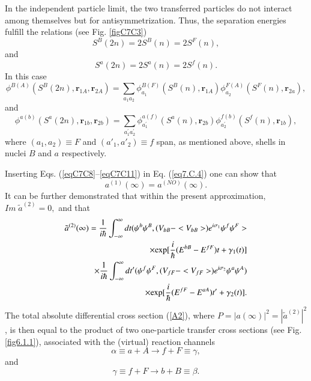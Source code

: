 In the independent particle limit, the two transferred particles do not interact among themselves but for antisymmetrization. 
Thus, the separation energies fulfill the relations (see Fig. \ref{figC7C3})
\begin{equation}\label{eqC7C8}
S^B(2n) = 2 S^B(n) = 2S^F(n),
\end{equation}
and 
\begin{equation}\label{eqC7C9}
S^a(2n) = 2 S^a(n) = 2 S^f(n).
\end{equation}
In this case 
\begin{equation}\label{eqC7C10}
\phi^{B(A)} (S^B(2n), \mathbf r_{1A},\mathbf r_{2A}) = \sum_{a_1 a_2} \phi_{a_1}^{B(F)} (S^B(n),\mathbf r_{1A}) 
\phi_{a_{2}}^{F(A)} (S^F(n),\mathbf r_{2a}),
\end{equation}
and 
\begin{equation}\label{eqC7C11}
\phi^{a(b)} (S^a(2n), \mathbf r_{1b},\mathbf r_{2b}) = 
\sum_{a^{'}_{1} a^{'}_{2}} \phi_{a^{'}_1}^{a(f)} (S^a(n),\mathbf r_{2b}) 
\phi_{a^{'}_{2}}^{f(b)} (S^f(n),\mathbf r_{1b}),
\end{equation}
where $(a_1, a_2) \equiv F$ and $(a'_1, a'_2) \equiv f$ span, as mentioned above, shells in nuclei $B$ and $a$ respectively. 

Inserting Eqs. (\ref{eqC7C8}--\ref{eqC7C11}) in Eq. (\ref{eq7.C.4}) one can show that 
\begin{equation}\label{eqC7C12}
a^{(1)} (\infty) = a^{(NO)}(\infty).
\end{equation}
It can be further demonstrated  that within the present approximation, $Im \; \tilde a^{(2)} =0,$ and that 
\begin{eqnarray}\label{eqC7C13}
\nonumber \tilde a^{(2)} (\infty) = \frac{1}{i \hbar} \int^{\infty}_{-\infty} dt (\psi^b \psi^B, (V_{bB} - <V_{bB}>) e^{i \sigma_1} \psi^f \psi^F >\\
\nonumber  \times 
{\rm exp} [\frac{i}{\hbar} (E^{bB} - E^{fF}) t + \gamma_1(t)] \nonumber  \\
\nonumber \times \frac{1}{i \hbar} \int^{\infty}_{-\infty} dt' (\psi^f \psi^F, (V_{fF} - <V_{fF}>) e^{i \sigma_2} \psi^a \psi^A ) \\
\times 
{\rm exp} [\frac{i}{\hbar} (E^{fF} - E^{aA}) t' + \gamma_2(t)].
\label{A12}
\end{eqnarray}
The total absolute differential cross section (\ref{A2}), where $P = |a(\infty)|^2 = |\tilde a^{(2)}|^2$, is then equal to the product of two one-particle transfer cross sections (see Fig. \ref{fig6.1.1}),  associated with the (virtual) reaction channels
\begin{equation}
\alpha \equiv a+A \to f +F \equiv \gamma,
\end{equation}
and 
\begin{equation}
\gamma \equiv f +F \to b+B \equiv \beta.
\end{equation}

